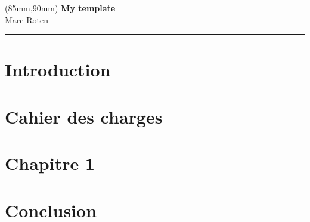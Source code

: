 \documentclass[11pt,b5paper]{book} %
\begin{document}
	
	
	
	\null\newpage %

	\thispagestyle{empty}
	\null\newpage

	\thispagestyle{empty}
	\begin{textblock*}{60mm}(85mm,90mm)
	\noindent
	{\sffamily\LARGE\bfseries My template}\\
	\noindent
	{\sffamily\small Marc Roten}\\
	{\color{dark-gray}\rule[5pt]{170pt}{3pt}}
	\end{textblock*}
	\null\newpage

	\thispagestyle{empty}
	
	
\section{Introduction}

\section{Cahier des charges}

\section{Chapitre 1}

\section{Conclusion}
\end{document}
